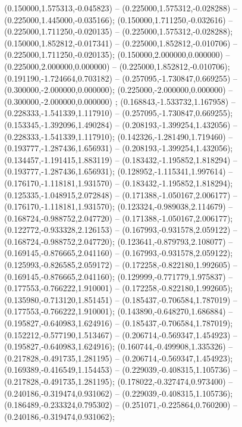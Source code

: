  (0.150000,1.575313,-0.045823) -- (0.225000,1.575312,-0.028288) -- (0.225000,1.445000,-0.035166);
 (0.150000,1.711250,-0.032616) -- (0.225000,1.711250,-0.020135) -- (0.225000,1.575312,-0.028288);
 (0.150000,1.852812,-0.017341) -- (0.225000,1.852812,-0.010706) -- (0.225000,1.711250,-0.020135);
 (0.150000,2.000000,0.000000) -- (0.225000,2.000000,0.000000) -- (0.225000,1.852812,-0.010706);
 (0.191190,-1.724664,0.703182) -- (0.257095,-1.730847,0.669255) -- (0.300000,-2.000000,0.000000);
 (0.225000,-2.000000,0.000000) -- (0.300000,-2.000000,0.000000) ;
 (0.168843,-1.533732,1.167958) -- (0.228333,-1.541339,1.117910) -- (0.257095,-1.730847,0.669255);
 (0.153345,-1.392096,1.490284) -- (0.208193,-1.399254,1.432056) -- (0.228333,-1.541339,1.117910);
 (0.142326,-1.281490,1.719460) -- (0.193777,-1.287436,1.656931) -- (0.208193,-1.399254,1.432056);
 (0.134457,-1.191415,1.883119) -- (0.183432,-1.195852,1.818294) -- (0.193777,-1.287436,1.656931);
 (0.128952,-1.115341,1.997614) -- (0.176170,-1.118181,1.931570) -- (0.183432,-1.195852,1.818294);
 (0.125335,-1.048915,2.072848) -- (0.171388,-1.050167,2.006177) -- (0.176170,-1.118181,1.931570);
 (0.123324,-0.989038,2.114679) -- (0.168724,-0.988752,2.047720) -- (0.171388,-1.050167,2.006177);
 (0.122772,-0.933328,2.126153) -- (0.167993,-0.931578,2.059122) -- (0.168724,-0.988752,2.047720);
 (0.123641,-0.879793,2.108077) -- (0.169145,-0.876665,2.041160) -- (0.167993,-0.931578,2.059122);
 (0.125993,-0.826585,2.059172) -- (0.172258,-0.822180,1.992605) -- (0.169145,-0.876665,2.041160);
 (0.129999,-0.771779,1.975837) -- (0.177553,-0.766222,1.910001) -- (0.172258,-0.822180,1.992605);
 (0.135980,-0.713120,1.851451) -- (0.185437,-0.706584,1.787019) -- (0.177553,-0.766222,1.910001);
 (0.143890,-0.648270,1.686884) -- (0.195827,-0.640983,1.624916) -- (0.185437,-0.706584,1.787019);
 (0.152212,-0.577190,1.513467) -- (0.206714,-0.569347,1.454923) -- (0.195827,-0.640983,1.624916);
 (0.160744,-0.499908,1.335326) -- (0.217828,-0.491735,1.281195) -- (0.206714,-0.569347,1.454923);
 (0.169389,-0.416549,1.154453) -- (0.229039,-0.408315,1.105736) -- (0.217828,-0.491735,1.281195);
 (0.178022,-0.327474,0.973400) -- (0.240186,-0.319474,0.931062) -- (0.229039,-0.408315,1.105736);
 (0.186489,-0.233324,0.795302) -- (0.251071,-0.225864,0.760200) -- (0.240186,-0.319474,0.931062);
